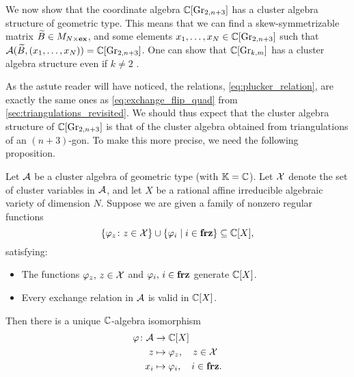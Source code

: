 \medskip

We now show that the coordinate algebra $\mathbb{C}[\operatorname{Gr}_{2,n+3}]$ has a cluster algebra
structure of geometric type. This means that we can find a skew-symmetrizable matrix
$\widetilde{B} \in M_{N \times \mathbf{ex}}$, and some elements $x_1, \dots, x_N \in \mathbb{C}[\operatorname{Gr}_{2, n+3}]$
such that $\mathcal{A}(\widetilde{B}, (x_1, \dots, x_N)) = \mathbb{C}[\operatorname{Gr}_{2, n+3}]$. One can show that
$\mathbb{C}[\operatorname{Gr}_{k,m}]$ has a cluster algebra structure even if $k \neq 2$
\parencite{Scott2006GrassmanniansCA}.

As the astute reader will have noticed, the relations, \cref{eq:plucker_relation}, are
exactly the same ones as \cref{eq:exchange_flip_quad} from
\cref{sec:triangulations_revisited}. We should thus expect that the cluster algebra
structure of $\mathbb{C}[\operatorname{Gr}_{2,n+3}]$ is that of the cluster algebra obtained from
triangulations of an $(n+3)$-gon. To make this more precise, we need the following
proposition.
\begin{proposition}\label{prop:cluster_structure}

	Let $\mathcal{A}$ be a cluster algebra of geometric type (with $\mathbb{K} = \mathbb{C}$). Let $\mathcal{X}$
	denote the set of cluster variables in $\mathcal{A}$, and let $X$ be a rational affine
	irreducible algebraic variety of dimension $N$. Suppose we are given a family of
	nonzero regular functions
	\begin{equation*}
		\{\varphi_z \colon z \in \mathcal{X} \} \cup \{\varphi_i \mid i \in \mathbf{frz}\} \subseteq \mathbb{C}[X],
	\end{equation*}
	satisfying:
	\begin{itemize}
		\item The functions $\varphi_z,\, z\in \mathcal{X}$ and $\varphi_i,\, i \in \mathbf{frz}$ generate
		      $\mathbb{C}[X]$.
		\item Every exchange relation in $\mathcal{A}$ is valid in $\mathbb{C}[X]$.
	\end{itemize}
	Then there is a unique $\mathbb{C}$-algebra isomorphism
	\begin{align*}
		\varphi \colon \mathcal{A} & \to \mathbb{C}[X]                         \\
		z                   & \mapsto \varphi_z,\quad z \in \mathcal{X}  \\
		x_i                 & \mapsto \varphi_i,\quad i \in \mathbf{frz}.
	\end{align*}
\end{proposition}

